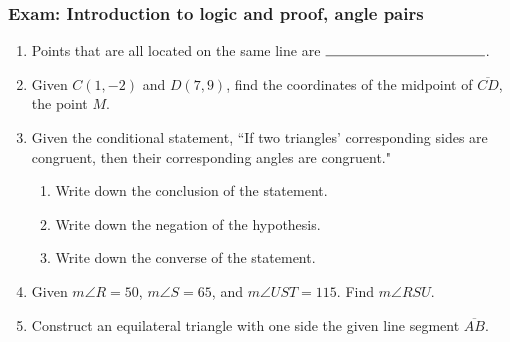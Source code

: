\documentclass[12pt, oneside]{article}
\begin{document}
\subsubsection*{Exam: Introduction to logic and proof, angle pairs}
  \vspace{0.5cm}
  \begin{enumerate}

  \item Points that are all located on the same line are $\rule{4cm}{0.15mm}$. \bigskip

  \item Given $C(1,-2)$ and $D(7,9)$, find the coordinates of the midpoint of $\overline{CD}$, the point $M$.
    \vspace{4cm}

  \item Given the conditional statement, ``If two triangles' corresponding sides are congruent, then their corresponding angles are congruent."
    \begin{enumerate}
      \item Write down the conclusion of the statement. \vspace{1.5cm}
      \item Write down the negation of the hypothesis. \vspace{1.5cm}
      \item Write down the converse of the statement. \vspace{2.5cm}
    \end{enumerate}

  \item Given $m\angle R=50$, $m\angle S =65$, and $m\angle UST=115$. Find $m\angle RSU$.\\[1cm]
    \vspace{3cm}

\newpage
  \item Construct an equilateral triangle with one side the given line segment $\overline{AB}$.\\
    \vspace{5cm}
    \begin{center}
    \end{center}
    \vspace{2cm}


\end{enumerate}
\end{document}
